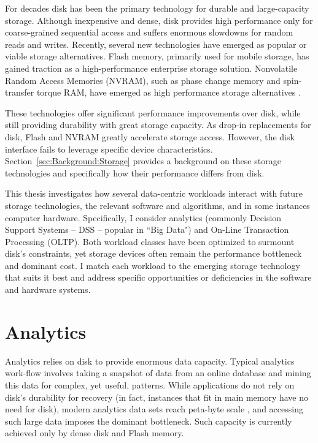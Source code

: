 For decades disk has been the primary technology for durable and large-capacity storage.
Although inexpensive and dense, disk provides high performance only for coarse-grained sequential access and suffers enormous slowdowns for random reads and writes.
Recently, several new technologies have emerged as popular or viable storage alternatives.
Flash memory, primarily used for mobile storage, has gained traction as a high-performance enterprise storage solution.
Nonvolatile Random Access Memories (NVRAM), such as phase change memory and spin-transfer torque RAM, have emerged as high performance storage alternatives \cite{BurrKurdi08}.

These technologies offer significant performance improvements over disk, while still providing durability with great storage capacity.
As drop-in replacements for disk, Flash and NVRAM greatly accelerate storage access.
However, the disk interface fails to leverage specific device characteristics.
Section~\ref{sec:Background:Storage} provides a background on these storage technologies and specifically how their performance differs from disk.

This thesis investigates how several data-centric workloads interact with future storage technologies, the relevant software and algorithms, and in some instances computer hardware.
Specifically, I consider analytics (commonly Decision Support Systems -- DSS -- popular in ``Big Data") and On-Line Transaction Processing (OLTP).
Both workload classes have been optimized to surmount disk's constraints, yet storage devices often remain the performance bottleneck and dominant cost.
I match each workload to the emerging storage technology that suits it best and address specific opportunities or deficiencies in the software and hardware systems.

\section{Analytics}
\label{sec:Intro:Analytics}

Analytics relies on disk to provide enormous data capacity.
Typical analytics work-flow involves taking a snapshot of data from an online database and mining this data for complex, yet useful, patterns.
While applications do not rely on disk's durability for recovery (in fact, instances that fit in main memory have no need for disk), modern analytics data sets reach peta-byte scale \cite{Economist10}, and accessing such large data imposes the dominant bottleneck.
Such capacity is currently achieved only by dense disk and Flash memory.

